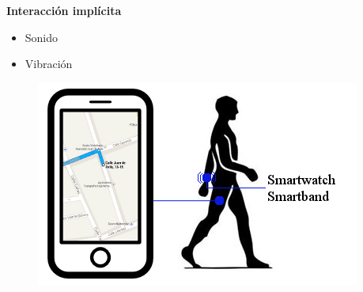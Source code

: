 \begin{slide}
  \begin{block}{\textbf{Interacción implícita}}
    \begin{itemize}
      \item Sonido
      \item Vibración
    \end{itemize}
  \end{block}
  \begin{figure}[!h]
    \begin{center}
      \includegraphics[height=0.6\textheight]{img/resumen.png}
    \end{center}
  \end{figure}
\end{slide}

